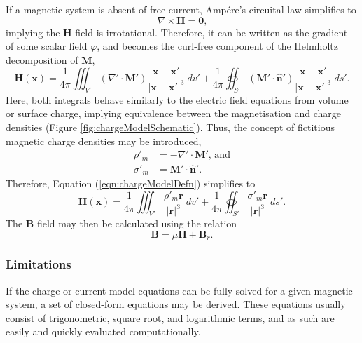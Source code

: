 If a magnetic system is absent of free current, Amp\'ere's circuital law simplifies to
\begin{equation}
    \nabla \times \mathbf{H} = \bm{0} \text{,}
\end{equation}
implying the \(\mathbf{H}\)-field is irrotational. Therefore, it can be written as the gradient of some scalar field \(\varphi\), and becomes the curl-free component of the Helmholtz decomposition of \(\mathbf{M}\),
\begin{equation}\label{eqn:chargeModelDefn}
    \mathbf{H}\left(\mathbf{x}\right) = \frac{1}{4\pi} \iiint_{V'} \left(\nabla' \cdot \mathbf{M}'\right) \frac{\mathbf{x}-\mathbf{x}'}{\left|\mathbf{x}-\mathbf{x}'\right|^3}\ dv' + \frac{1}{4\pi} \oiint_{S'} \left( \mathbf{M}' \cdot \hat{\mathbf{n}}' \right) \frac{\mathbf{x}-\mathbf{x}'}{\left|\mathbf{x}-\mathbf{x}'\right|^3}\ ds' \text{.}
\end{equation}
Here, both integrals behave similarly to the electric field equations from volume or surface charge, implying equivalence between the magnetisation and charge densities (Figure \ref{fig:chargeModelSchematic}). Thus, the concept of fictitious magnetic charge densities may be introduced,
\begin{align}
    \rho'_m &= -\nabla' \cdot \mathbf{M}' \text{, and} \\
    \sigma'_m &= \mathbf{M}' \cdot \hat{\mathbf{n}}' \text{.}
\end{align}
Therefore, Equation (\ref{eqn:chargeModelDefn}) simplifies to
\begin{equation}
    \mathbf{H}\left(\mathbf{x}\right) = \frac{1}{4\pi} \iiint_{V'} \frac{\rho'_m \mathbf{r}}{\left|\mathbf{r}\right|^3}\ dv' + \frac{1}{4\pi} \oiint_{S'} \frac{\sigma'_m \mathbf{r}}{\left|\mathbf{r}\right|^3}\ ds' \text{.}
\end{equation}
The \(\mathbf{B}\) field may then be calculated using the relation
\begin{equation}
    \mathbf{B} = \mu \mathbf{H} + \mathbf{B}_r \text{.}
\end{equation}

\subsubsection{Limitations}
If the charge or current model equations can be fully solved for a given magnetic system, a set of closed-form equations may be derived. These equations usually consist of trigonometric, square root, and logarithmic terms, and as such are easily and quickly evaluated computationally.

